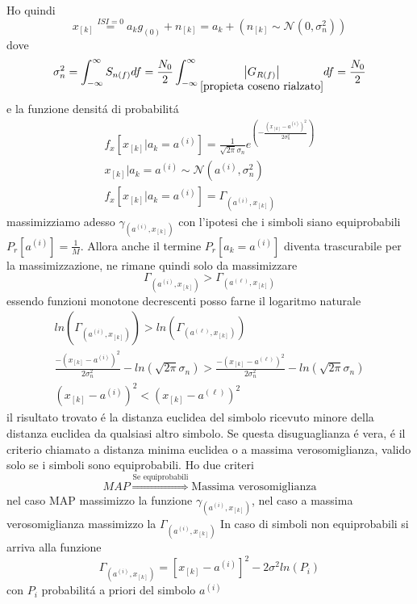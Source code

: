             Ho quindi 
            \[
                x_{[k]} \overset{ISI=0}{=} a_kg_{(0)} + n_{[k]} = a_k + (n_{[k]} \sim \mathcal{N}(0,\sigma_n^2))
            \]
            dove 
            \[
                \sigma_n^2 = \int_{-\infty}^{\infty}S_{n(f)}df = \frac{N_0}{2} \int_{-\infty}^{\infty}\underset{\ref{propieta coseno rialzato}}{\left| G_{R(f)} \right|} df = \frac{N_0}{2}  
            \]
            e la funzione densitá di probabilitá 
            \begin{gather}
                f_x[x_{[k]}|a_k = a^{(i)}] = \frac{1}{\sqrt{2\pi}\sigma_n}e^{\left(\displaystyle -\frac{(x_{[k]}-a^{(i)})^2}{2\sigma_n^2}\right)} \nonumber \\
                x_{[k]} | a_k = a^{(i)} \sim \mathcal{N}(a^{(i)},\sigma_n^2)\nonumber \\
                f_x[x_{[k]}|a_k = a^{(i)}] = \Gamma_{(a^{(i)},x_{[k]})} \nonumber
            \end{gather}
            massimizziamo adesso $\gamma_{(a^{(i)},x_{[k]})}$ con l'ipotesi che i simboli siano equiprobabili $P_r[a^{(i)}] = \frac{1}{M}$. Allora anche il termine
            $P_r[a_k = a^{(i)}]$ diventa trascurabile per la massimizzazione, ne rimane quindi solo da massimizzare
            \[
                \Gamma_{(a^{(i)},x_{[k]})} > \Gamma_{(a^{(\ell)},x_{[k]})}    
            \]
            essendo funzioni monotone decrescenti posso farne il logaritmo naturale
            \begin{gather}
                ln\left(\Gamma_{(a^{(i)},x_{[k]})} \right)> ln\left(\Gamma_{(a^{(\ell)},x_{[k]})}\right) \nonumber\\
                \frac{-\left(x_{[k]}-a^{(i)}\right)^2}{2\sigma_n^2}-ln\left(\sqrt{2\pi}\sigma_n\right) >  \frac{-\left(x_{[k]}-a^{(\ell)}\right)^2}{2\sigma_n^2}-ln\left(\sqrt{2\pi}\sigma_n\right)\nonumber \\
                \left(x_{[k]}-a^{(i)}\right)^2<\left(x_{[k]}-a^{(\ell)}\right)^2\nonumber    
            \end{gather}
            il risultato trovato é la distanza euclidea del simbolo ricevuto minore della distanza euclidea da qualsiasi altro simbolo. Se
            questa disuguaglianza é vera, é il criterio chiamato a distanza minima euclidea o a massima verosomiglianza, valido solo se i simboli
            sono equiprobabili. Ho due criteri 
            \[
                MAP \overset{\text{Se equiprobabili}}{\Rightarrow} \text{Massima verosomiglianza}  
            \] 
            nel caso MAP massimizzo la funzione $\gamma_{(a^{(i)},x_{[k]})}$, nel caso a massima verosomiglianza massimizzo la $\Gamma_{(a^{(i)},x_{[k]})}$ 
            In caso di simboli non equiprobabili si arriva alla funzione 
            \[
                \Gamma_{(a^{(i)},x_{[k]})} = \left[x_{[k]}-a^{(i)}\right]^2-2\sigma^2ln(P_i)
            \]
            con $P_i$ probabilitá a priori del simbolo $a^{(i)}$
